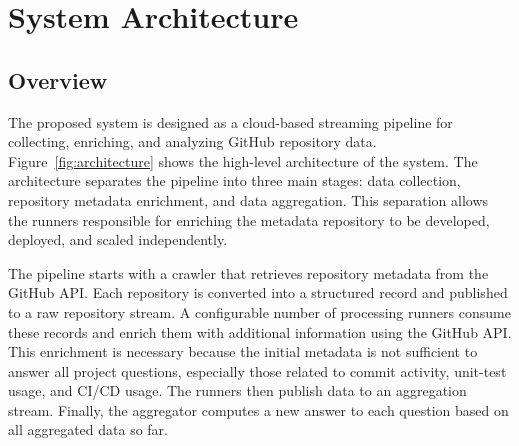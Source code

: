 \documentclass[conference]{IEEEtran}
\begin{document}
\section{System Architecture}
\label{sec:architecture}

\subsection{Overview}
The proposed system is designed as a cloud-based streaming pipeline for
collecting, enriching, and analyzing GitHub repository data.
Figure~\ref{fig:architecture} shows the high-level architecture of the system.
The architecture separates the pipeline into three main stages: data collection,
repository metadata enrichment, and data aggregation. This separation allows the
runners responsible for enriching the metadata repository to be developed,
deployed, and scaled independently.

The pipeline starts with a crawler that retrieves repository metadata from the
GitHub API. Each repository is converted into a structured record and published
to a raw repository stream. A configurable number of processing runners consume
these records and enrich them with additional information using the GitHub API.
This enrichment is necessary because the initial metadata is not sufficient to
answer all project questions, especially those related to commit activity,
unit-test usage, and CI/CD usage. The runners then publish data to an
aggregation stream. Finally, the aggregator computes a new answer to each
question based on all aggregated data so far.
\end{document}
